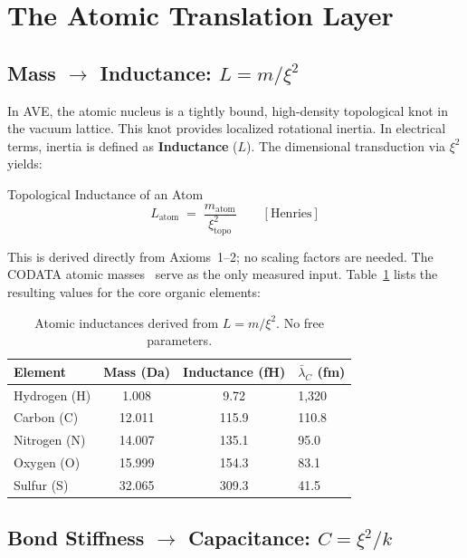 \section{The Atomic Translation Layer}
\label{sec:atomic_translation_layer}

\subsection{Mass $\rightarrow$ Inductance:  $L = m / \xi^2$}

In AVE, the atomic nucleus is a tightly bound, high-density topological knot in the vacuum lattice. This knot provides localized rotational inertia. In electrical terms, inertia is defined as \textbf{Inductance} ($L$). The dimensional transduction via $\xi^2$ yields:
\begin{resultbox}{Topological Inductance of an Atom}
\begin{equation}
    L_\text{atom} \;=\; \frac{m_\text{atom}}{\xi^2_\text{topo}}
    \qquad [\text{Henries}]
    \label{eq:L_atom}
\end{equation}
\end{resultbox}
This is derived directly from Axioms~1--2; no scaling factors are needed. The CODATA atomic masses~\cite{codata2018} serve as the only measured input. Table~\ref{tab:inductances} lists the resulting values for the core organic elements:

\begin{table}[h]
\centering
\begin{tabularx}{\textwidth}{@{}lccX@{}}
\hline
\textbf{Element} & \textbf{Mass (Da)} & \textbf{Inductance (fH)} & \textbf{$\bar{\lambda}_C$ (fm)} \\
\hline
Hydrogen (H) & 1.008 & 9.72 & 1,320 \\
Carbon (C)   & 12.011 & 115.9 & 110.8 \\
Nitrogen (N) & 14.007 & 135.1 & 95.0 \\
Oxygen (O)   & 15.999 & 154.3 & 83.1 \\
Sulfur (S)   & 32.065 & 309.3 & 41.5 \\
\hline
\end{tabularx}
\caption{Atomic inductances derived from $L = m / \xi^2$. No free parameters.}
\label{tab:inductances}
\end{table}

\subsection{Bond Stiffness $\rightarrow$ Capacitance:  $C = \xi^2 / k$}

